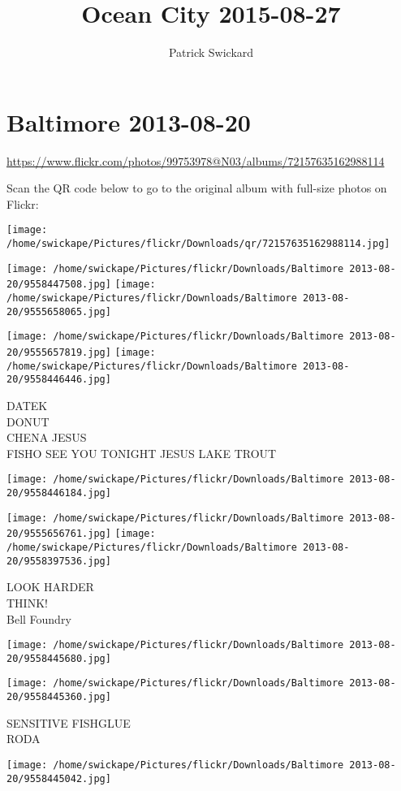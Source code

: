 \documentclass[10pt,letterpaper]{article}
\title{Ocean City 2015-08-27}
\author{Patrick Swickard}
\date{}
\begin{document}
\section*{Baltimore 2013-08-20}

\url{https://www.flickr.com/photos/99753978@N03/albums/72157635162988114}

Scan the QR code below to go to the original album with full-size photos on Flickr:

\texttt{[image: /home/swickape/Pictures/flickr/Downloads/qr/72157635162988114.jpg]}
\pagebreak

\texttt{[image: /home/swickape/Pictures/flickr/Downloads/Baltimore 2013-08-20/9558447508.jpg]}
\texttt{[image: /home/swickape/Pictures/flickr/Downloads/Baltimore 2013-08-20/9555658065.jpg]}

\texttt{[image: /home/swickape/Pictures/flickr/Downloads/Baltimore 2013-08-20/9555657819.jpg]}
\texttt{[image: /home/swickape/Pictures/flickr/Downloads/Baltimore 2013-08-20/9558446446.jpg]}

DATEK\\
DONUT\\
CHENA JESUS\\
FISHO SEE YOU TONIGHT JESUS LAKE TROUT
\pagebreak

\texttt{[image: /home/swickape/Pictures/flickr/Downloads/Baltimore 2013-08-20/9558446184.jpg]}

\vspace{0.25in}
\texttt{[image: /home/swickape/Pictures/flickr/Downloads/Baltimore 2013-08-20/9555656761.jpg]}
\texttt{[image: /home/swickape/Pictures/flickr/Downloads/Baltimore 2013-08-20/9558397536.jpg]}

LOOK HARDER\\
THINK!\\
Bell Foundry
\pagebreak

\texttt{[image: /home/swickape/Pictures/flickr/Downloads/Baltimore 2013-08-20/9558445680.jpg]}

\vspace{0.25in}
\texttt{[image: /home/swickape/Pictures/flickr/Downloads/Baltimore 2013-08-20/9558445360.jpg]}

SENSITIVE FISHGLUE\\
RODA
\pagebreak

\texttt{[image: /home/swickape/Pictures/flickr/Downloads/Baltimore 2013-08-20/9558445042.jpg]}
\end{document}
